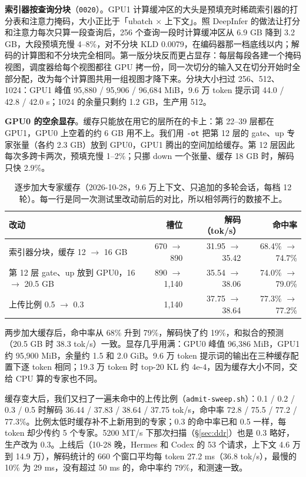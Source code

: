 \documentclass[11pt,a4paper]{article}
\newcommand{\code}[1]{\texttt{#1}}
\newcommand{\tps}{tok/s}
\begin{document}
\textbf{索引器按查询分块}（\code{0020}）。GPU1 计算缓冲区的大头是预填充时稀疏索引器的打分表和注意力掩码，大小正比于「ubatch × 上下文」。照 DeepInfer 的做法让打分和注意力每次只算一段查询后，256 个查询一段时计算缓冲区从 6.9 GB 降到 3.2 GB，大段预填充慢 4--8\%，对不分块 KLD 0.0079，在编码器那一档底线以内；解码的计算图和不分块完全相同。第一版分块反而更占显存：每层每段各建一个掩码视图，调度器给每个视图都往 GPU 拷一份，同一次切分的输入又在切分开始时全部分配，改为每个计算图共用一组视图才降下来。分块大小扫过 256、512、1024：GPU1 峰值 95,880 / 95,906 / 96,684 MiB，9.6 万 token 提示词 44.0 / 42.8 / 42.0 s；1024 的余量只剩约 1.2 GB，生产用 512。

\textbf{GPU0 的空余显存}。缓存只能放在用它的层所在的卡上：第 22--39 层都在 GPU1，GPU0 上空着的约 6 GB 用不上。我们用 \code{-ot} 把第 12 层的 gate、up 专家张量（各约 2.3 GB）放到 GPU0，GPU1 腾出的空间加给缓存。第 12 层因此每次多跨卡两次，预填充慢 1--2\%；只挪 down 一个张量、缓存 18 GB 时，解码只快 2.9\%。

\begin{table}[h]
  \centering
  \small
  \caption{逐步加大专家缓存（2026-10-28，9.6 万上下文、只追加的多轮会话，每档 12 轮）。每一行是同一次测试里改动前后的对比，所以相邻两行的数接不上。}
  \label{tab:cachegrow}
  \begin{tabular}{@{}l r r r@{}}
    \toprule
    改动 & 槽位 & 解码（\tps） & 命中率 \\
    \midrule
    索引器分块，缓存 12 $\to$ 16 GB & 670 $\to$ 890 & 31.95 $\to$ 35.42 & 68.4\% $\to$ 74.7\% \\
    第 12 层 gate、up 放到 GPU0，16 $\to$ 20.5 GB & 890 $\to$ 1,140 & 35.54 $\to$ 38.06 & 74.0\% $\to$ 79.0\% \\
    上传比例 0.5 $\to$ 0.3 & 1,140 & 37.75 $\to$ 38.64 & 77.3\% $\to$ 77.2\% \\
    \bottomrule
  \end{tabular}
\end{table}

两步加大缓存后，命中率从 68\% 升到 79\%，解码快了约 19\%，和拟合的预测（20.5 GB 时 38.3 \tps{}）一致。显存几乎用满：GPU0 峰值 96,386 MiB，GPU1 约 95,900 MiB，余量约 1.5 和 2.0 GiB。9.6 万 token 提示词的输出在三种缓存配置下逐 token 相同；19.3 万 token 时 top-20 KL 约 4e-4，因为缓存大小不同，交给 CPU 算的专家也不同。

缓存变大后，我们又扫了一遍未命中的上传比例（\code{admit-sweep.sh}）：0.1 / 0.2 / 0.3 / 0.5 时解码 36.44 / 37.83 / 38.64 / 37.75 \tps{}，命中率 72.8 / 75.5 / 77.2 / 77.3\%。比例太低时缓存补不上新用到的专家；0.3 的命中率已和 0.5 一样，每 token 却少传约 5 个专家。5200 MT/s 下那次扫描（\S\ref{sec:ddr}）也是 0.3 略好，生产改为 0.3。上线后（10-28 晚，Hermes 和 Codex 的 53 个请求，上下文 4.6 万到 14.9 万），解码统计的 660 个窗口平均每 token 27.2 ms（36.8 \tps{}），最慢的 10\% 为 29 ms，没有超过 50 ms 的，命中率约 79\%，和测速一致。
\end{document}
